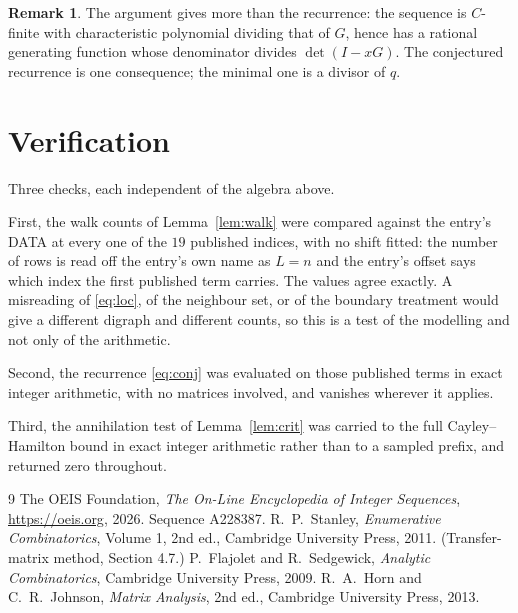 \documentclass[11pt,a4paper]{article}
\theoremstyle{plain}
\theoremstyle{definition}
\newtheorem{remark}[theorem]{Remark}
\begin{document}
\begin{remark}
The argument gives more than the recurrence: the sequence is $C$-finite with characteristic
polynomial dividing that of $G$, hence has a rational generating function whose denominator
divides $\det(I-xG)$. The conjectured recurrence is one consequence; the minimal one is a
divisor of $q$.
\end{remark}

\section{Verification}

Three checks, each independent of the algebra above.

First, the walk counts of Lemma~\ref{lem:walk} were compared against the entry's DATA at
every one of the $19$ published indices, with no shift fitted: the number of rows is
read off the entry's own name as $L=n$ and the entry's offset says which index the first
published term carries. The values agree exactly. A misreading of \eqref{eq:loc}, of the
neighbour set, or of the boundary treatment would give a different digraph and different
counts, so this is a test of the modelling and not only of the arithmetic.

Second, the recurrence \eqref{eq:conj} was evaluated on those published terms in exact
integer arithmetic, with no matrices involved, and vanishes wherever it applies.

Third, the annihilation test of Lemma~\ref{lem:crit} was carried to the full
Cayley--Hamilton bound in exact integer arithmetic rather than to a sampled prefix, and
returned zero throughout.

\begin{thebibliography}{9}
 The OEIS Foundation, \emph{The On-Line Encyclopedia of Integer
Sequences}, \url{https://oeis.org}, 2026. Sequence A228387.
 R.~P.~Stanley, \emph{Enumerative Combinatorics}, Volume 1, 2nd ed.,
Cambridge University Press, 2011. (Transfer-matrix method, Section 4.7.)
 P.~Flajolet and R.~Sedgewick, \emph{Analytic Combinatorics}, Cambridge
University Press, 2009.
 R.~A.~Horn and C.~R.~Johnson, \emph{Matrix Analysis}, 2nd ed., Cambridge
University Press, 2013.
\end{thebibliography}
\end{document}
